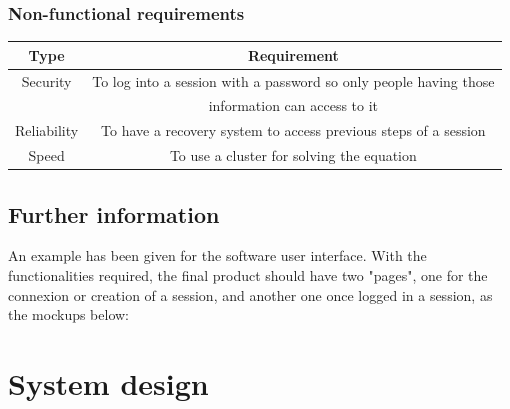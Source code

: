 \documentclass[10pt,a4paper]{report}
\begin{document}
		\subsubsection{Non-functional requirements}
\begin{tabular}{|c|c|}
\hline 
\textbf{Type} & \textbf{Requirement} \\ 
\hline 
Security & To log into a session with a password so only people having those\\
 & information can access to it\\ 
\hline 
Reliability & To have a recovery system to access previous steps of a session \\ 
\hline 
Speed & To use a cluster for solving the equation \\ 
\hline
\end{tabular} 
	\subsection{Further information}
An example has been given for the software user interface. With the functionalities required, the final product should have two "pages", one for the connexion or creation of a session, and another one once logged in a session, as the mockups below:\\

\pagebreak
\section{System design}
\end{document}
